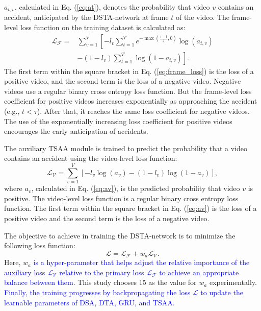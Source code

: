 \documentclass[journal]{IEEEtran}
\begin{document}
$a_{t,v}$, calculated in Eq. (\ref{eq:at}),  denotes the probability that video $v$ contains an accident, anticipated by the DSTA-network at frame $t$ of the video. The frame-level loss function on the training dataset is calculated as:
\begin{equation}
\begin{aligned}
    \mathcal{L_F} =& \sum_{v=1}^V\left[-l_v\sum_{t=1}^Te^{-\max\left(\frac{\tau-t}{f},0\right)}\log(a_{t,v})\right.\\
    &\left. -(1-l_v)\sum_{t=1}^T\log(1-a_{t,v})\right].
\end{aligned}
\label{eq:frame_loss}
\end{equation}
The first term within the square bracket in Eq. (\ref{eq:frame_loss})  is the loss of a positive video, and the second term is the loss of a negative video. Negative videos use a regular binary cross entropy loss function. But the frame-level loss coefficient for positive videos increases exponentially as approaching the accident (e.g., $t<\tau$). After that, it reaches the same loss coefficient for negative videos. The use of the exponentially increasing loss coefficient for positive videos encourages the early anticipation of accidents.

The auxiliary TSAA module is trained to predict the probability that a video contains an accident using the video-level loss function:
\begin{equation}
\mathcal{L_V} =\sum_{v=1}^V \left[-l_v\log(a_v) -(1-l_v) \log(1-a_v)\right],
\label{eq:vid_loss}
\end{equation}
where $a_v$, calculated in Eq. (\ref{eq:av}), is the predicted probability that video $v$ is positive. The video-level loss function is a regular binary cross entropy loss function. The first term within the square bracket in Eq. (\ref{eq:av}) is the loss of a positive video and the second term is the loss of a negative video. 

The objective to achieve in training the DSTA-network is to minimize the following loss function:
\begin{equation}
\mathcal{L} = \mathcal{L_F} + w_a \mathcal{L_V}.
\label{eq:loss}
\end{equation}
Here, $w_a$ \textcolor{blue}{is a hyper-parameter that helps adjust the relative importance of the auxiliary loss $\mathcal{L_V}$ relative to the primary loss $\mathcal{L_F}$ to achieve an appropriate balance between them.} This study chooses 15 as the value for $w_a$ experimentally. \textcolor{blue}{Finally, the training progresses by backpropagating the loss $\mathcal{L}$ to update the learnable parameters of DSA, DTA, GRU, and TSAA.}
\end{document}
